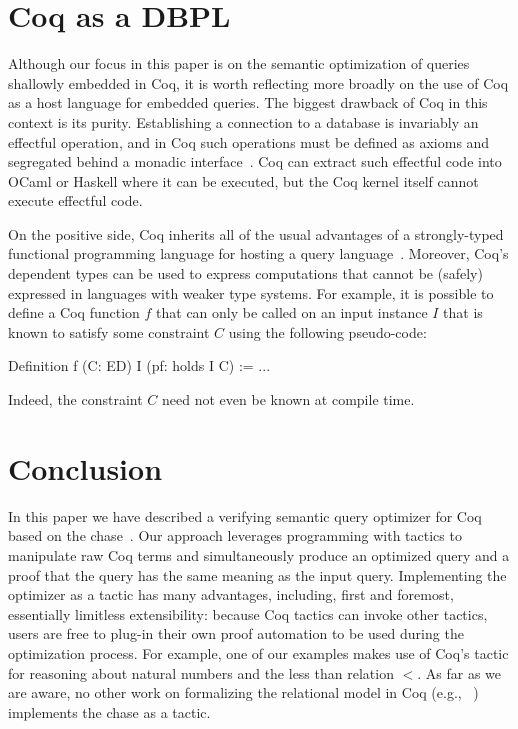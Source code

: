 \documentclass[preprint]{sigplanconf}
\begin{document}
\section{Coq as a DBPL}

Although our focus in this paper is on the semantic optimization of queries shallowly embedded in Coq, it is worth reflecting more broadly on the use of Coq as a host language for embedded queries.  The biggest drawback of Coq in this context is its purity.  Establishing a connection to a database is invariably an effectful operation, and in Coq such operations must be defined as axioms and segregated behind a monadic interface~\cite{Malecha:2010:TVR:1706299.1706329}.  Coq can extract such effectful code into OCaml or Haskell where it can be executed, but the Coq kernel itself cannot execute effectful code.

On the positive side, Coq inherits all of the usual advantages of a strongly-typed functional programming language for hosting a query language~\cite{monad}.  Moreover, Coq's dependent types can be used to express computations that cannot be (safely) expressed in languages with weaker type systems.  For example, it is possible to define a Coq function $f$ that can only be called on an input instance $I$ that is known to satisfy some constraint $C$ using the following pseudo-code:
\begin{coq}
Definition f (C: ED) I (pf: holds I C) := ...
\end{coq}
Indeed, the constraint $C$ need not even be known at compile time.  

\section{Conclusion}
In this paper we have described a verifying semantic query optimizer for Coq based on the chase~\cite{Deutsch:2006:QRC:1121995.1122010}.  Our approach leverages programming with tactics to manipulate raw Coq terms and simultaneously produce an optimized query and a proof that the query has the same meaning as the input query.  Implementing the optimizer as a tactic has many advantages, including, first and foremost, essentially limitless extensibility: because Coq tactics can invoke other tactics, users are free to plug-in their own proof automation to be used during the optimization process.  For example, one of our examples makes use of Coq's  tactic for reasoning about natural numbers and the less than relation $<$.   As far as we are aware, no other work on formalizing the relational model in Coq (e.g., ~\cite{coqdb}) implements the chase as a tactic.
\end{document}
